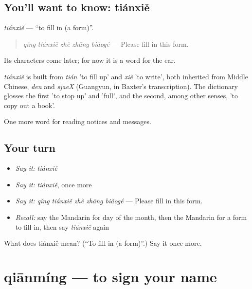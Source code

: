 \subsection*{You'll want to know: tiánxiě}
\emph{tiánxiě} — \textquotedblleft{}to fill in (a form)\textquotedblright{}.

\begin{quote}
\emph{qǐng tiánxiě zhè zhāng biǎogé} — Please fill in this form.
\end{quote}

Its characters come later; for now it is a word for the ear.

\begin{cousinweb}
\emph{tiánxiě} is built from \emph{tián} 'to fill up' and \emph{xiě} 'to write', both inherited from Middle Chinese, \emph{den} and \emph{sjaeX} (Guangyun, in Baxter's transcription). The dictionary glosses the first 'to stop up' and 'full', and the second, among other senses, 'to copy out a book'.
\end{cousinweb}

\begin{grammarlens}[title={What you've built}]
One more word for reading notices and messages.
\end{grammarlens}

\subsection*{Your turn}
\begin{itemize}
\raggedright
  \item \emph{Say it:} \emph{tiánxiě}
  \item \emph{Say it:} \emph{tiánxiě}, once more
  \item \emph{Say it:} \emph{qǐng tiánxiě zhè zhāng biǎogé} — Please fill in this form.
  \item \emph{Recall:} say the Mandarin for day of the month, then the Mandarin for a form to fill in, then say \emph{tiánxiě} again
\end{itemize}

\begin{tcolorbox}[breakable,colback=teal!4,colframe=teal!35!black,title={Before you move on}]
What does tiánxiě mean? (\textquotedblleft{}To fill in (a form)\textquotedblright{}.) Say it once more.
\end{tcolorbox}
\section[qiānmíng]{qiānmíng — to sign your name}

